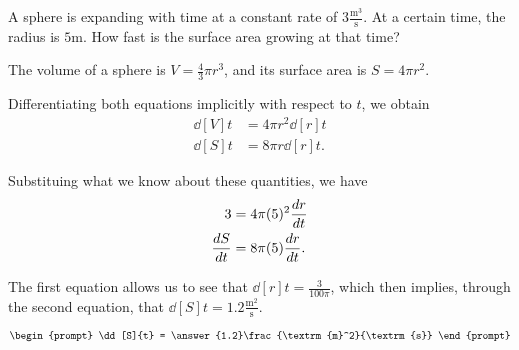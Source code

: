 \documentclass{ximera}
\author{Steven Gubkin}
\begin{document}
\begin{exercise}

A sphere is expanding with time at a constant rate of $3
\frac{\textrm{m}^3}{\textrm{s}}$.  At a certain time, the radius is $5
\textrm{m}$.  How fast is the surface area growing at that time?

\begin{hint}
  The volume of a sphere is $V = \frac{4}{3} \pi r^3$, and its surface area is $S = 4 \pi r^2$.
\end{hint}

\begin{hint}
  Differentiating  both equations implicitly with respect to $t$, we obtain
\begin{align*}
\dd[V]{t} &= 4 \pi r^2 \dd[r]{t} \\
\dd[S]{t} &= 8\pi r \dd[r]{t}.
\end{align*}
\end{hint}

\begin{hint}
	Substituing what we know about these quantities, we have
\begin{align*}
3 &= 4 \pi (5)^2 \dd[r]{t} \\
\frac{\d S}{\d t} &= 8\pi (5) \dd[r]{t}.
\end{align*}
\end{hint}

\begin{hint}
  The first equation allows us to see that $\dd[r]{t} =
  \frac{3}{100 \pi}$, which then implies, through the second equation,
  that $\dd[S]{t} = 1.2\frac{\textrm{m}^2}{\textrm{s}}$.
\end{hint}


\[
\begin{prompt}
	\dd[S]{t} = \answer{1.2}\frac{\textrm{m}^2}{\textrm{s}}
\end{prompt}
\]

\end{exercise}
\end{document}
